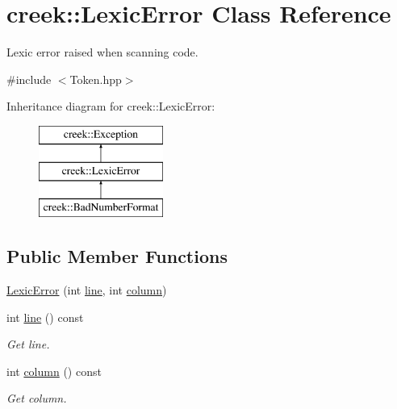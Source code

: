 \hypertarget{classcreek_1_1_lexic_error}{}\section{creek\+:\+:Lexic\+Error Class Reference}
\label{classcreek_1_1_lexic_error}


Lexic error raised when scanning code.  




{\ttfamily \#include $<$Token.\+hpp$>$}

Inheritance diagram for creek\+:\+:Lexic\+Error\+:\begin{figure}[H]
\begin{center}
\leavevmode
\includegraphics[height=3.000000cm]{classcreek_1_1_lexic_error}
\end{center}
\end{figure}
\subsection*{Public Member Functions}
\begin{DoxyCompactItemize}
\item 
\hyperlink{classcreek_1_1_lexic_error_a0a86f5ac573e235fdf48a1a27254b90b}{Lexic\+Error} (int \hyperlink{classcreek_1_1_lexic_error_a80a01ab094f2e89db9258fb111b0749d}{line}, int \hyperlink{classcreek_1_1_lexic_error_ab03a66cccc9bd40b074371fdbbf64398}{column})
\item 
int \hyperlink{classcreek_1_1_lexic_error_a80a01ab094f2e89db9258fb111b0749d}{line} () const \hypertarget{classcreek_1_1_lexic_error_a80a01ab094f2e89db9258fb111b0749d}{}\label{classcreek_1_1_lexic_error_a80a01ab094f2e89db9258fb111b0749d}

\begin{DoxyCompactList}\small\item\em Get line. \end{DoxyCompactList}\item 
int \hyperlink{classcreek_1_1_lexic_error_ab03a66cccc9bd40b074371fdbbf64398}{column} () const \hypertarget{classcreek_1_1_lexic_error_ab03a66cccc9bd40b074371fdbbf64398}{}\label{classcreek_1_1_lexic_error_ab03a66cccc9bd40b074371fdbbf64398}

\begin{DoxyCompactList}\small\item\em Get column. \end{DoxyCompactList}\end{DoxyCompactItemize}
